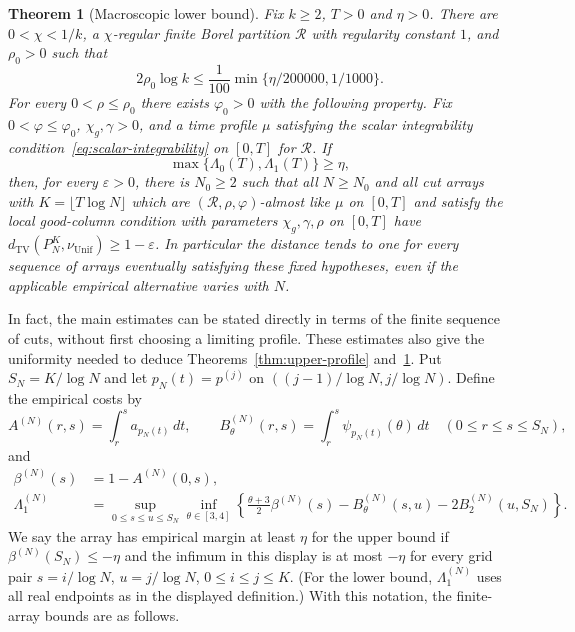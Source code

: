 \documentclass[11pt]{article}
\numberwithin{equation}{section}
\newtheorem{theorem}{Theorem}[section]
\theoremstyle{definition}
\theoremstyle{remark}
\newcommand{\TV}{\mathrm{TV}}
\newcommand{\Unif}{\mathrm{Unif}}
\newcommand{\dTV}{d_{\TV}}
\newcommand{\nuUnif}{\nu_{\Unif}}
\newcommand{\1}{\mathbf 1}
\begin{document}
\begin{theorem}[Macroscopic lower bound]%
\label{thm:macroscopic-lower}
Fix $k\ge2$, $T>0$ and $\eta>0$. There are $0<\chi<1/k$, a $\chi$-regular finite Borel
partition $\mathcal R$ with regularity constant $1$, and $\rho_0>0$ such that
\[
 2\rho_0\log k\le\frac1{100}\min\{\eta/200000,1/1000\}.
\]
For every $0<\rho\le\rho_0$ there exists $\varphi_0>0$ with the following
property. Fix $0<\varphi\le\varphi_0$, $\chi_g,\gamma>0$, and a time
profile $\mu$ satisfying the scalar integrability condition~\eqref{eq:scalar-integrability} on $[0,T]$ for $\mathcal R$. If
\[
 \max\{\Lambda_0(T),\Lambda_1(T)\}\ge\eta,
\]
then, for every $\varepsilon>0$, there is $N_0\ge2$ such that all
$N\ge N_0$ and all cut arrays with $K=\lfloor T\log N\rfloor$ which are
$(\mathcal R,\rho,\varphi)$-almost like $\mu$ on $[0,T]$ and satisfy the local
good-column condition with parameters $\chi_g,\gamma,\rho$ on $[0,T]$
have $\dTV(P_N^K,\nuUnif)\ge1-\varepsilon$. In particular the distance
tends to one for every sequence of arrays eventually satisfying these
fixed hypotheses, even if the applicable empirical alternative varies
with $N$.
\end{theorem}

In fact, the main estimates can be stated directly in terms of the
finite sequence of cuts, without first choosing a limiting profile.
These estimates also give the uniformity needed to deduce
Theorems~\ref{thm:upper-profile} and~\ref{thm:macroscopic-lower}.
Put $S_N=K/\log N$ and let $p_N(t)=p^{(j)}$ on
$((j-1)/\log N,j/\log N)$. Define the empirical costs by
\[
 A^{(N)}(r,s)=\int_r^s a_{p_N(t)}\,dt,\qquad
 B^{(N)}_\theta(r,s)=\int_r^s\psi_{p_N(t)}(\theta)\,dt
 \quad(0\le r\le s\le S_N),
\]
and
\begin{align*}
 \beta^{(N)}(s)&=1-A^{(N)}(0,s),\\
 \Lambda_1^{(N)}&=\sup_{0\le s\le u\le S_N}\inf_{\theta\in[3,4]}
 \left\{\frac{\theta+3}{2}\beta^{(N)}(s)
       -B^{(N)}_\theta(s,u)-2B^{(N)}_2(u,S_N)\right\}.
\end{align*}
We say the array has empirical margin at least $\eta$ for the upper bound if
$\beta^{(N)}(S_N)\le-\eta$ and the infimum in this display
is at most $-\eta$ for every grid pair
$s=i/\log N$, $u=j/\log N$, $0\le i\le j\le K$.
(For the lower bound, $\Lambda_1^{(N)}$ uses all real endpoints as in
the displayed definition.) With this notation, the finite-array bounds
are as follows.
\end{document}
